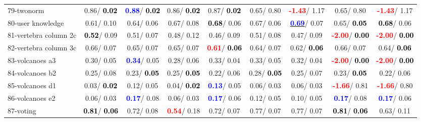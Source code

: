 \begin{table}[h]
\begin{center}
\begin{tabular}{lc|c|c|c|c|c|c|c}
79-twonorm &   0.86/\textcolor{black}{\textbf{  0.02}} & \textcolor{blue}{\textbf{  0.88}}/\textcolor{black}{\textbf{  0.02}} &   0.86/\textcolor{black}{\textbf{  0.02}} &   0.87/\textcolor{black}{\textbf{  0.02}} &   0.65/  0.80 & \textcolor{red}{\textbf{ -1.43}}/  1.17 &   0.65/  0.80 & \textcolor{red}{\textbf{ -1.43}}/  1.17 \\
80-user knowledge &   0.61/  0.10 &   0.64/  0.06 &   0.67/  0.08 & \textcolor{black}{\textbf{  0.68}}/  0.06 &   0.67/  0.06 & \underline{\textcolor{blue}{\textbf{  0.69}}}/  0.07 &   0.65/\textcolor{black}{\textbf{  0.05}} & \textcolor{black}{\textbf{  0.68}}/  0.06 \\
81-vertebra column 2c & \textcolor{black}{\textbf{  0.52}}/  0.09 &   0.51/  0.07 &   0.48/  0.12 &   0.46/  0.09 &   0.51/  0.08 &   0.47/  0.09 & \textcolor{red}{\textbf{ -2.00}}/\textcolor{black}{\textbf{  0.00}} & \textcolor{red}{\textbf{ -2.00}}/\textcolor{black}{\textbf{  0.00}} \\
82-vertebra column 3c &   0.66/  0.07 &   0.65/  0.07 &   0.65/  0.07 & \textcolor{red}{\textbf{  0.61}}/\textcolor{black}{\textbf{  0.06}} &   0.64/  0.07 &   0.62/\textcolor{black}{\textbf{  0.06}} &   0.66/  0.07 &   0.64/\textcolor{black}{\textbf{  0.06}} \\
83-volcanoes a3 &   0.30/  0.05 & \textcolor{blue}{\textbf{  0.34}}/  0.05 &   0.28/  0.06 &   0.33/  0.04 &   0.33/  0.05 &   0.32/  0.04 & \textcolor{red}{\textbf{ -2.00}}/\textcolor{black}{\textbf{  0.00}} & \textcolor{red}{\textbf{ -2.00}}/\textcolor{black}{\textbf{  0.00}} \\
84-volcanoes b2 &   0.25/  0.08 &   0.23/\textcolor{black}{\textbf{  0.05}} &   0.25/\textcolor{black}{\textbf{  0.05}} &   0.22/  0.06 &   0.28/\textcolor{black}{\textbf{  0.05}} &   0.25/  0.07 &   0.23/\textcolor{black}{\textbf{  0.05}} &   0.22/  0.06 \\
85-volcanoes d1 &   0.03/\textcolor{black}{\textbf{  0.02}} &   0.12/  0.05 &   0.04/\textcolor{black}{\textbf{  0.02}} & \textcolor{blue}{\textbf{  0.13}}/  0.05 &   0.06/  0.03 &   0.06/  0.03 & \textcolor{red}{\textbf{ -1.66}}/  0.81 & \textcolor{red}{\textbf{ -1.66}}/  0.80 \\ \hline
86-volcanoes e2 &   0.06/  0.03 & \textcolor{blue}{\textbf{  0.17}}/  0.08 &   0.06/  0.03 & \textcolor{blue}{\textbf{  0.17}}/  0.06 &   0.12/  0.05 &   0.10/  0.05 & \textcolor{blue}{\textbf{  0.17}}/  0.08 & \textcolor{blue}{\textbf{  0.17}}/  0.06 \\
87-voting & \textcolor{black}{\textbf{  0.81}}/\textcolor{black}{\textbf{  0.06}} &   0.72/  0.08 & \textcolor{red}{\textbf{  0.54}}/  0.18 &   0.72/  0.07 &   0.77/  0.07 &   0.77/  0.07 & \textcolor{black}{\textbf{  0.81}}/\textcolor{black}{\textbf{  0.06}} &   0.63/  0.11 \\

\end{tabular}
\end{center}
\end{table}
